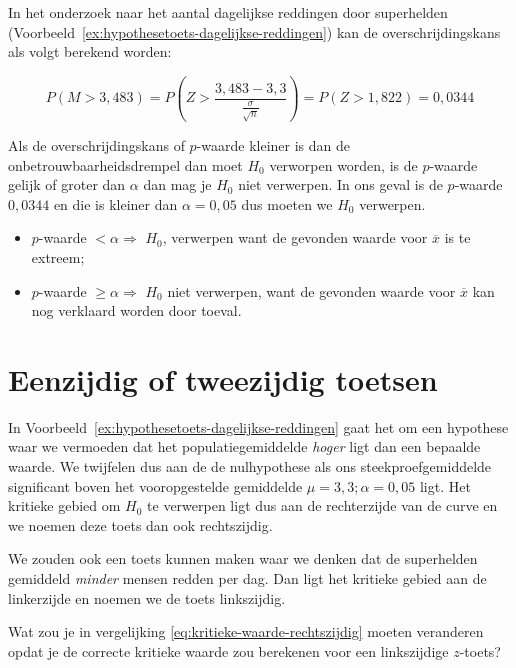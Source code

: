 \begin{example}
  In het onderzoek naar het aantal dagelijkse reddingen door superhelden (Voorbeeld~\ref{ex:hypothesetoets-dagelijkse-reddingen}) kan de overschrijdingskans als volgt berekend worden:
  
\[ P(M > 3,483) = P \left(Z> \frac{3,483 - 3,3}{\frac{\sigma}{\sqrt{n}}}\right) = P (Z > 1,822) = 0,0344 \]
\end{example}

Als de overschrijdingskans of $p$-waarde kleiner is dan de onbetrouwbaarheidsdrempel dan moet $H_{0}$ verworpen worden, is de $p$-waarde gelijk of groter dan $\alpha$ dan mag je $H_{0}$ niet verwerpen. In ons geval is de $p$-waarde $0,0344$ en die is kleiner dan $\alpha = 0,05$ dus moeten we $H_{0}$ verwerpen.

\begin{itemize}
  \item $p$-waarde $< \alpha \Rightarrow$ $H_{0}$, verwerpen want de gevonden waarde voor $\overline{x}$ is te extreem;
  \item $p$-waarde $\geq \alpha \Rightarrow$ $H_{0}$ niet verwerpen, want de gevonden waarde voor $\overline{x}$ kan nog verklaard worden door toeval.
\end{itemize}

\section{Eenzijdig of tweezijdig toetsen}
\label{sec:eenzijdig-of-tweezijdig}

In Voorbeeld~\ref{ex:hypothesetoets-dagelijkse-reddingen} gaat het om een hypothese waar we vermoeden dat het populatiegemiddelde \emph{hoger} ligt dan een bepaalde waarde. We twijfelen dus aan de de nulhypothese als ons steekproefgemiddelde significant boven het vooropgestelde gemiddelde $\mu = 3,3; \alpha = 0,05$ ligt. Het kritieke gebied om $H_{0}$ te verwerpen ligt dus aan de rechterzijde van de curve en we noemen deze toets dan ook rechtszijdig.

We zouden ook een toets kunnen maken waar we denken dat de superhelden gemiddeld \emph{minder} mensen redden per dag. Dan ligt het kritieke gebied aan de linkerzijde en noemen we de toets linkszijdig.

\begin{exercise}
  \label{ex:kritieke-waarde-linkszijdig}
  Wat zou je in vergelijking \ref{eq:kritieke-waarde-rechtszijdig} moeten veranderen opdat je de correcte kritieke waarde zou berekenen voor een linkszijdige $z$-toets?
\end{exercise}

